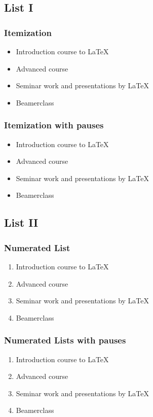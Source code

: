 \documentclass{beamer}	%
\begin{document}
\subsection{List I}
\begin{frame}\frametitle{Itemization}
\begin{itemize}
\item Introduction course to \LaTeX  
\item Advanced course
\item Seminar work and presentations by \LaTeX 
\item Beamerclass
\end{itemize} 
\end{frame}

\begin{frame}\frametitle{Itemization with pauses}
\begin{itemize}
\item Introduction course to \LaTeX  \pause 
\item Advanced course \pause 
\item Seminar work and presentations by \LaTeX  \pause 
\item Beamerclass
\end{itemize} 
\end{frame}

\subsection{List II}
\begin{frame}\frametitle{Numerated List}
\begin{enumerate}
\item Introduction course to \LaTeX  
\item Advanced course
\item Seminar work and presentations by \LaTeX 
\item Beamerclass
\end{enumerate}
\end{frame}

\begin{frame}\frametitle{Numerated Lists with pauses}
\begin{enumerate}
\item Introduction course to \LaTeX  \pause 
\item Advanced course \pause 
\item Seminar work and presentations by \LaTeX  \pause 
\item Beamerclass
\end{enumerate}
\end{frame}
\end{document}
